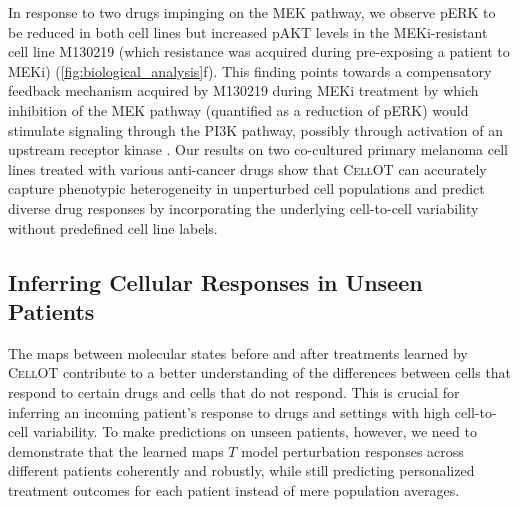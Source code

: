  In response to two drugs impinging on the MEK pathway, we observe pERK to be reduced in both cell lines but increased pAKT levels in the MEKi-resistant cell line M130219 (which resistance was acquired during pre-exposing a patient to MEKi) (\cref{fig:biological_analysis}f). This finding points towards a compensatory feedback mechanism acquired by M130219 during MEKi treatment by which inhibition of the MEK pathway (quantified as a reduction of pERK) would stimulate signaling through the PI3K pathway, possibly through activation of an upstream receptor kinase \citep{caunt2015mek1}. 
Our results on two co-cultured primary melanoma cell lines treated with various anti-cancer drugs show that \textsc{CellOT} can accurately capture phenotypic heterogeneity in unperturbed cell populations and predict diverse drug responses by incorporating the underlying cell-to-cell variability without predefined cell line labels. 
    
\subsection{Inferring Cellular Responses in Unseen Patients}
The maps between molecular states before and after treatments learned by \textsc{CellOT} contribute to a better understanding of the differences between cells that respond to certain drugs and cells that do not respond. This is crucial for inferring an incoming patient's response to drugs and settings with high cell-to-cell variability.
To make predictions on unseen patients, however, we need to demonstrate that the learned maps $T$ model perturbation responses across different patients coherently and robustly, while still predicting personalized treatment outcomes for each patient instead of mere population averages.

